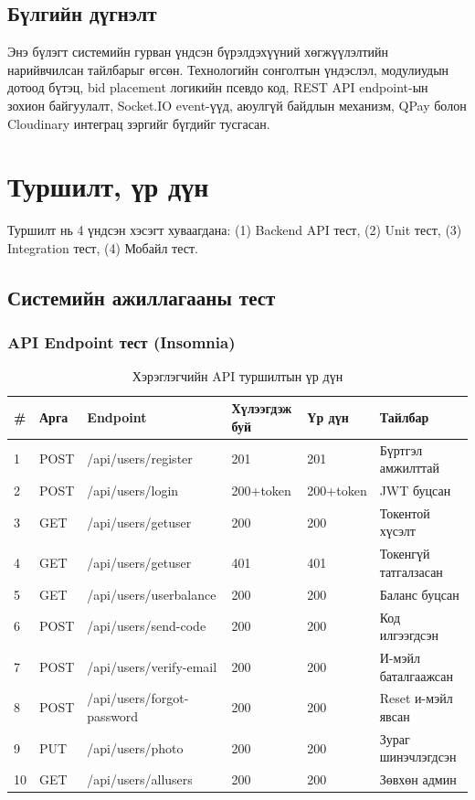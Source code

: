 \documentclass[12pt, a4paper]{report}
\begin{document}
\section{Бүлгийн дүгнэлт}

Энэ бүлэгт системийн гурван үндсэн бүрэлдэхүүний хөгжүүлэлтийн нарийвчилсан тайлбарыг өгсөн. Технологийн сонголтын үндэслэл, модулиудын дотоод бүтэц, bid placement логикийн псевдо код, REST API endpoint-ын зохион байгуулалт, Socket.IO event-үүд, аюулгүй байдлын механизм, QPay болон Cloudinary интеграц зэргийг бүгдийг тусгасан.

\chapter{Туршилт, үр дүн}

Туршилт нь 4 үндсэн хэсэгт хуваагдана: (1) Backend API тест, (2) Unit тест, (3) Integration тест, (4) Мобайл тест.

\section{Системийн ажиллагааны тест}

\subsection{API Endpoint тест (Insomnia)}

\begin{table}[H]
  \centering
  \caption{Хэрэглэгчийн API туршилтын үр дүн}
  \label{tab:user-api-test}
  \begin{tabularx}{\textwidth}{C{0.5cm}C{1.2cm}L{5cm}C{2cm}C{1.5cm}L{3.5cm}}
    \toprule
    \textbf{\#} & \textbf{Арга} & \textbf{Endpoint} & \textbf{Хүлээгдэж буй} & \textbf{Үр дүн} & \textbf{Тайлбар} \\
     & POST & /api/users/register & 201 & 201 & Бүртгэл амжилттай \\
    2 & POST & /api/users/login & 200+token & 200+token & JWT буцсан \\
    3 & GET & /api/users/getuser & 200 & 200 & Токентой хүсэлт \\
    4 & GET & /api/users/getuser & 401 & 401 & Токенгүй татгалзасан \\
    5 & GET & /api/users/userbalance & 200 & 200 & Баланс буцсан \\
    6 & POST & /api/users/send-code & 200 & 200 & Код илгээгдсэн \\
    7 & POST & /api/users/verify-email & 200 & 200 & И-мэйл баталгаажсан \\
    8 & POST & /api/users/forgot-password & 200 & 200 & Reset и-мэйл явсан \\
    9 & PUT & /api/users/photo & 200 & 200 & Зураг шинэчлэгдсэн \\
    10 & GET & /api/users/allusers & 200 & 200 & Зөвхөн админ \\
    \bottomrule
  \end{tabularx}
\end{table}
\end{document}

